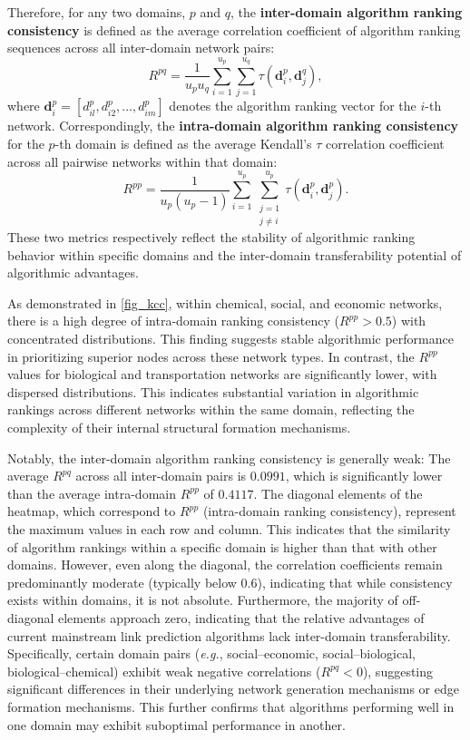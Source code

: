 \documentclass{article}
\begin{document}
Therefore, for any two domains, $p$ and $q$, the \textbf{inter-domain algorithm ranking consistency} is defined as the average correlation coefficient of algorithm ranking sequences across all inter-domain network pairs:
\begin{equation}
	R^{pq} = \frac{1}{u_p u_q} \sum_{i=1}^{u_p} \sum_{j=1}^{u_q} \tau\left( \bm{d}_i^p, \bm{d}_j^q \right),
\end{equation}
 where $\bm{d}_i^p = [d_{il}^p, d_{i2}^p, \dots, d_{im}^p]$ denotes the algorithm ranking vector for the $i$-th network. Correspondingly, the \textbf{intra-domain algorithm ranking consistency} for the $p$-th domain is defined as the average Kendall's $\tau$ correlation coefficient across all pairwise networks within that domain:
\begin{equation}
	R^{pp} = \frac{1}{u_p(u_p - 1)} \sum_{i=1}^{u_p} \sum_{\substack{j=1 \\ j \neq i}}^{u_p} \tau\left( \bm{d}_i^p, \bm{d}_j^p \right).
\end{equation}
These two metrics respectively reflect the stability of algorithmic ranking behavior within specific domains and the inter-domain transferability potential of algorithmic advantages.
	
 As demonstrated in \autoref{fig_kcc}, within chemical, social, and economic networks, there is a high degree of intra-domain ranking consistency ($R^{pp} > 0.5$) with concentrated distributions. This finding suggests stable algorithmic performance in prioritizing superior nodes across these network types. In contrast, the $R^{pp}$ values for biological and transportation networks are significantly lower, with dispersed distributions. This indicates substantial variation in algorithmic rankings across different networks within the same domain, reflecting the complexity of their internal structural formation mechanisms.
	
Notably, the inter-domain algorithm ranking consistency is generally weak: The average $R^{pq}$ across all inter-domain pairs is $0.0991$, which is significantly lower than the average intra-domain $R^{pp}$ of $0.4117$. The diagonal elements of the heatmap, which correspond to $R^{pp}$ (intra-domain ranking consistency), represent the maximum values in each row and column. This indicates that the similarity of algorithm rankings within a specific domain is higher than that with other domains. However, even along the diagonal, the correlation coefficients remain predominantly moderate (typically below $0.6$), indicating that while consistency exists within domains, it is not absolute. Furthermore, the majority of off-diagonal elements approach zero, indicating that the relative advantages of current mainstream link prediction algorithms lack inter-domain transferability. Specifically, certain domain pairs (\textit{e.g.}, social--economic, social--biological, biological--chemical) exhibit weak negative correlations ($R^{pq}<0$), suggesting significant differences in their underlying network generation mechanisms or edge formation mechanisms. This further confirms that algorithms performing well in one domain may exhibit suboptimal performance in another.
\end{document}
